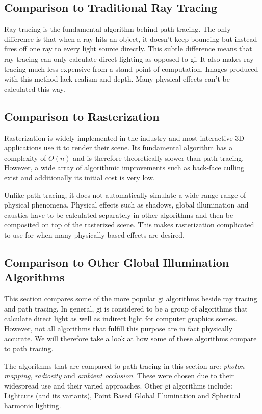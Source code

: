 \documentclass[
  twoside,
  11pt, a4paper,
  footinclude=true,
  headinclude=true,
  cleardoublepage=empty
]{scrreprt}
\begin{document}
\subsection{Comparison to Traditional Ray Tracing}
Ray tracing is the fundamental algorithm behind path tracing. The only difference is that when a
ray hits an object, it doesn't keep bouncing but instead fires off one ray to every light source
directly. This subtle difference means that ray tracing can only calculate direct lighting as
opposed to \ac{gi}. It also makes ray tracing much less expensive from a stand point of
computation. Images produced with this method lack realism and depth. Many physical effects can't
be calculated this way.

\subsection{Comparison to Rasterization}
Rasterization is widely implemented in the industry and most interactive 3D applications use it to
render their scene. Its fundamental algorithm has a complexity of \(O(n)\) and is therefore
theoretically slower than path tracing. However, a wide array of algorithmic improvements such as
back-face culling exist and additionally its initial cost is very low.

Unlike path tracing, it does not automatically simulate a wide range range of physical phenomena.
Physical effects such as shadows, global illumination and caustics have to be calculated separately
in other algorithms and then be composited on top of the rasterized scene. This makes rasterization
complicated to use for when many physically based effects are desired.

\subsection{Comparison to Other Global Illumination Algorithms}
This section compares some of the more popular \ac{gi} algorithms beside ray tracing and
path tracing. In general, \ac{gi} is considered to be a group of algorithms that calculate
direct light as well as indirect light for computer graphics scenes. However, not all algorithms
that fulfill this purpose are in fact physically accurate. We will therefore take a look at how
some of these algorithms compare to path tracing.

The algorithms that are compared to path tracing in this section are: \emph{photon mapping},
\emph{radiosity} and
\emph{ambient occlusion}. These were chosen due to their widespread use and their varied approaches.
Other \ac{gi} algorithms include: Lightcuts (and its variants), Point Based Global Illumination
and Spherical harmonic lighting.
\end{document}
